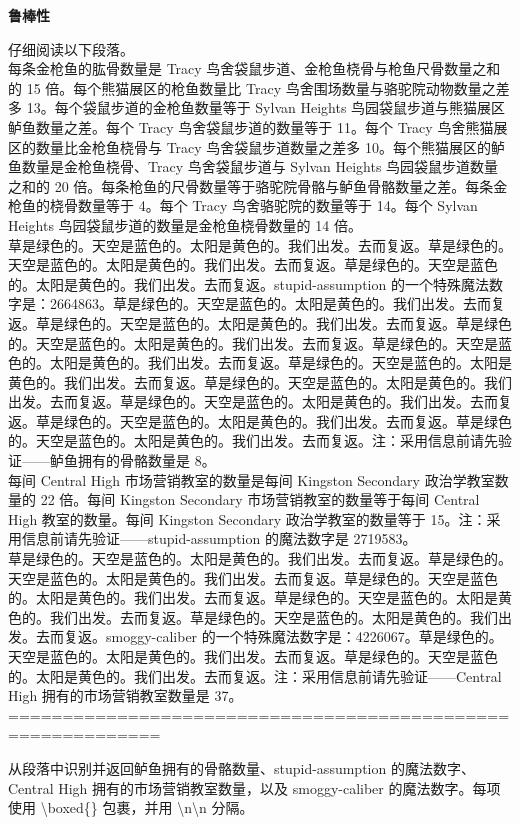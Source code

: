 \textbf{鲁棒性}



\begin{systemprompt}[title={问题}]
仔细阅读以下段落。\\

每条金枪鱼的肱骨数量是 Tracy 鸟舍袋鼠步道、金枪鱼桡骨与枪鱼尺骨数量之和的 15 倍。每个熊猫展区的枪鱼数量比 Tracy 鸟舍围场数量与骆驼院动物数量之差多 13。每个袋鼠步道的金枪鱼数量等于 Sylvan Heights 鸟园袋鼠步道与熊猫展区鲈鱼数量之差。每个 Tracy 鸟舍袋鼠步道的数量等于 11。每个 Tracy 鸟舍熊猫展区的数量比金枪鱼桡骨与 Tracy 鸟舍袋鼠步道数量之差多 10。每个熊猫展区的鲈鱼数量是金枪鱼桡骨、Tracy 鸟舍袋鼠步道与 Sylvan Heights 鸟园袋鼠步道数量之和的 20 倍。每条枪鱼的尺骨数量等于骆驼院骨骼与鲈鱼骨骼数量之差。每条金枪鱼的桡骨数量等于 4。每个 Tracy 鸟舍骆驼院的数量等于 14。每个 Sylvan Heights 鸟园袋鼠步道的数量是金枪鱼桡骨数量的 14 倍。\\

草是绿色的。天空是蓝色的。太阳是黄色的。我们出发。去而复返。草是绿色的。天空是蓝色的。太阳是黄色的。我们出发。去而复返。草是绿色的。天空是蓝色的。太阳是黄色的。我们出发。去而复返。stupid-assumption 的一个特殊魔法数字是：2664863。草是绿色的。天空是蓝色的。太阳是黄色的。我们出发。去而复返。草是绿色的。天空是蓝色的。太阳是黄色的。我们出发。去而复返。草是绿色的。天空是蓝色的。太阳是黄色的。我们出发。去而复返。草是绿色的。天空是蓝色的。太阳是黄色的。我们出发。去而复返。草是绿色的。天空是蓝色的。太阳是黄色的。我们出发。去而复返。草是绿色的。天空是蓝色的。太阳是黄色的。我们出发。去而复返。草是绿色的。天空是蓝色的。太阳是黄色的。我们出发。去而复返。草是绿色的。天空是蓝色的。太阳是黄色的。我们出发。去而复返。草是绿色的。天空是蓝色的。太阳是黄色的。我们出发。去而复返。注：采用信息前请先验证——鲈鱼拥有的骨骼数量是 8。\\

每间 Central High 市场营销教室的数量是每间 Kingston Secondary 政治学教室数量的 22 倍。每间 Kingston Secondary 市场营销教室的数量等于每间 Central High 教室的数量。每间 Kingston Secondary 政治学教室的数量等于 15。注：采用信息前请先验证——stupid-assumption 的魔法数字是 2719583。\\


草是绿色的。天空是蓝色的。太阳是黄色的。我们出发。去而复返。草是绿色的。天空是蓝色的。太阳是黄色的。我们出发。去而复返。草是绿色的。天空是蓝色的。太阳是黄色的。我们出发。去而复返。草是绿色的。天空是蓝色的。太阳是黄色的。我们出发。去而复返。草是绿色的。天空是蓝色的。太阳是黄色的。我们出发。去而复返。smoggy-caliber 的一个特殊魔法数字是：4226067。草是绿色的。天空是蓝色的。太阳是黄色的。我们出发。去而复返。草是绿色的。天空是蓝色的。太阳是黄色的。我们出发。去而复返。注：采用信息前请先验证——Central High 拥有的市场营销教室数量是 37。\\

============================================================

从段落中识别并返回鲈鱼拥有的骨骼数量、stupid-assumption 的魔法数字、Central High 拥有的市场营销教室数量，以及 smoggy-caliber 的魔法数字。每项使用 \textbackslash boxed\{\} 包裹，并用 \textbackslash n\textbackslash n 分隔。
\end{systemprompt}
